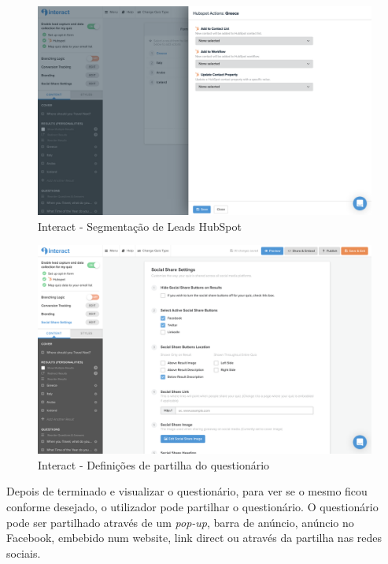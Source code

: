 \begin{figure}[ht!]
	\begin{center}
		\includegraphics[width=1\textwidth]{img/interact/collect2}
		\caption{Interact - Segmentação de Leads HubSpot}
		\label{fig:interact-collect2}
	\end{center}
\end{figure}

\begin{figure}[ht!]
	\begin{center}
		\includegraphics[width=1\textwidth]{img/interact/share}
		\caption{Interact - Definições de partilha do questionário}
		\label{fig:interact-share}
	\end{center}
\end{figure}

\newpage

Depois de terminado e visualizar o questionário, para ver se o mesmo ficou conforme desejado, o utilizador pode partilhar o questionário. O questionário pode ser partilhado através de um \textit{pop-up}, barra de anúncio, anúncio no Facebook, embebido num website, link direct ou através da partilha nas redes sociais. 

